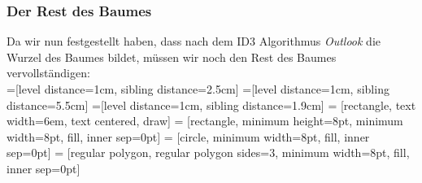 \documentclass{article}
\begin{document}
\subsubsection*{Der Rest des Baumes}
Da wir nun festgestellt haben, dass nach dem ID3 Algorithmus \textit{Outlook}
die Wurzel des Baumes bildet, müssen wir noch den Rest des Baumes
vervollständigen:\\[3em]


=[level distance=1cm, sibling distance=2.5cm]
=[level distance=1cm, sibling distance=5.5cm]
=[level distance=1cm, sibling distance=1.9cm]
 = [rectangle, text width=6em, text centered, draw]
 = [rectangle, minimum height=8pt, minimum width=8pt, fill, inner sep=0pt]
 = [circle, minimum width=8pt, fill, inner sep=0pt]
 = [regular polygon, regular polygon sides=3, minimum width=8pt, fill, inner sep=0pt]
\end{document}
